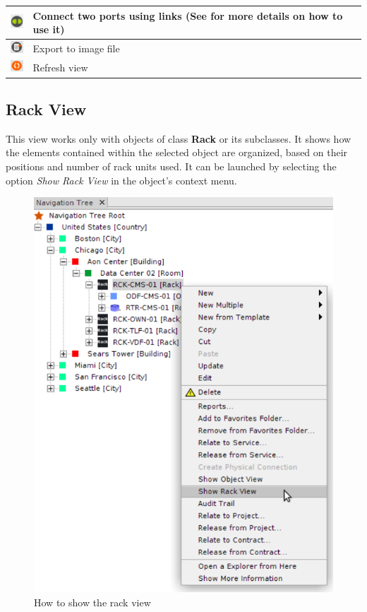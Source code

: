 \documentclass[a4paper]{article}
\begin{document}
\begin{table}[h!]
\begin{tabular}[h!]{lp{10cm}}
				\midrule
				\includegraphics[width=0.5cm]{img/object_view_link.png} & Connect two ports using links (See \textbf{\nameref{sec:physical_connections}} for more details on how to use it)\\	
				\midrule
				\includegraphics[width=0.5cm]{img/icon_export.png} & Export to image file\\
				\midrule
				\includegraphics[width=0.5cm]{img/icon_refresh_view.png} & Refresh view\\			
			\end{tabular}
		\end{table}
		
		\subsection{Rack View} \label{sec:rack_view}
		This view works only with objects of class \textbf{Rack} or its subclasses. It shows how the elements contained within the selected object are organized, based on their positions and number of rack units used. It can be launched by selecting the option \textit{Show Rack View} in the object's context menu.
		\begin{figure}[h!]
			\centering
			\includegraphics[width=0.5\linewidth]{img/show_rack_view.png}
			\caption{How to show the rack view}
			\label{fig:rack_view_combobox}
		\end{figure}
		
\end{document}
